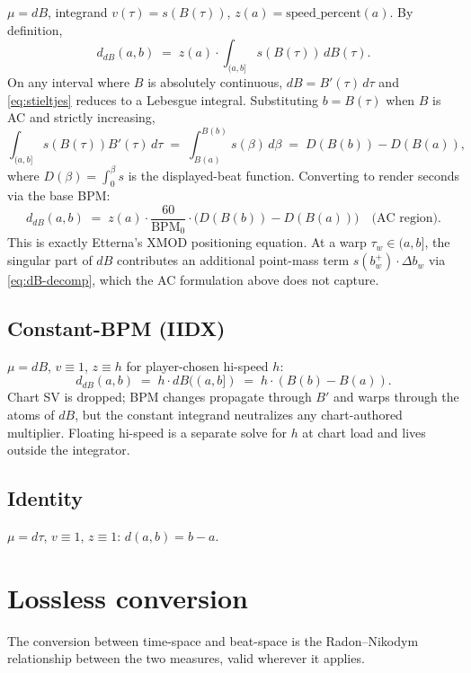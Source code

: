 \documentclass[11pt]{article}
\theoremstyle{definition}
\newcommand{\bpmz}{\mathrm{BPM}_0}
\newcommand{\dB}{\,dB}
\newcommand{\dtau}{\,d\tau}
\begin{document}
$\mu = dB$, integrand $v(\tau) = s(B(\tau))$, $z(a) = \mathrm{speed\_percent}(a)$.
By definition,
\begin{equation}
\label{eq:stieltjes}
d_{dB}(a, b)
\;=\; z(a) \cdot \int_{(a,b]} s(B(\tau))\dB(\tau).
\end{equation}
On any interval where $B$ is absolutely continuous, $dB = B'(\tau)\dtau$ and
\eqref{eq:stieltjes} reduces to a Lebesgue integral. Substituting $b = B(\tau)$
when $B$ is AC and strictly increasing,
\[
\int_{(a,b]} s(B(\tau)) B'(\tau)\dtau \;=\; \int_{B(a)}^{B(b)} s(\beta)\, d\beta
\;=\; D(B(b)) - D(B(a)),
\]
where $D(\beta) = \int_0^\beta s$ is the displayed-beat function. Converting to
render seconds via the base BPM:
\[
d_{dB}(a, b) \;=\; z(a) \cdot \frac{60}{\bpmz} \cdot \bigl(D(B(b)) - D(B(a))\bigr) \quad \text{(AC region)}.
\]
This is exactly Etterna's XMOD positioning equation. At a warp $\tau_w \in (a,b]$,
the singular part of $dB$ contributes an additional point-mass term
$s(b_w^+) \cdot \Delta b_w$ via \eqref{eq:dB-decomp}, which the AC formulation
above does not capture.

\subsection{Constant-BPM (IIDX)}

$\mu = dB$, $v \equiv 1$, $z \equiv h$ for player-chosen hi-speed $h$:
\[
d_{dB}(a, b) \;=\; h \cdot dB((a, b]) \;=\; h \cdot (B(b) - B(a)).
\]
Chart SV is dropped; BPM changes propagate through $B'$ and warps through the
atoms of $dB$, but the constant integrand neutralizes any chart-authored
multiplier. Floating hi-speed is a separate solve for $h$ at chart load and
lives outside the integrator.

\subsection{Identity}

$\mu = d\tau$, $v \equiv 1$, $z \equiv 1$: $d(a,b) = b - a$.

\section{Lossless conversion}
\label{sec:conv}

The conversion between time-space and beat-space is the Radon--Nikodym
relationship between the two measures, valid wherever it applies.
\end{document}
